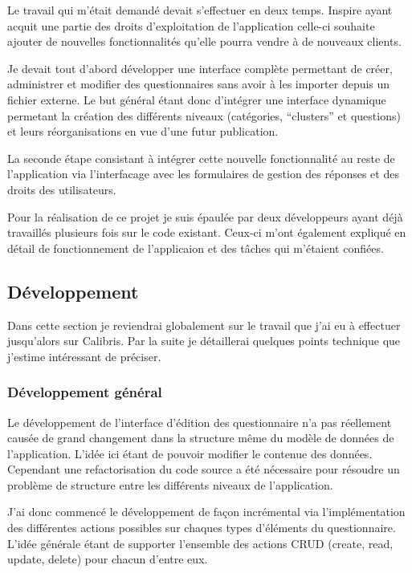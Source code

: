 \documentclass[12pt,a4paper]{book}
\begin{document}
Le travail qui m'était demandé devait s'effectuer en deux temps. Inspire ayant acquit une partie des droits d'exploitation de l'application celle-ci souhaite ajouter de nouvelles fonctionnalités qu'elle pourra vendre à de nouveaux clients.

Je devait tout d'abord développer une interface complète permettant de créer, administrer et modifier des questionnaires sans avoir à les importer depuis un fichier externe. Le but général étant donc d'intégrer une interface dynamique permetant la création des différents niveaux (catégories, ``clusters'' et questions) et leurs réorganisations en vue d'une futur publication.

La seconde étape consistant à intégrer cette nouvelle fonctionnalité au reste de l'application via l'interfacage avec les formulaires de gestion des réponses et des droits des utilisateurs.

Pour la réalisation de ce projet je suis épaulée par deux développeurs ayant déjà travaillés plusieurs fois sur le code existant. Ceux-ci m'ont également expliqué en détail de fonctionnement de l'applicaion et des tâches qui m'étaient confiées.

\subsection{Développement}

Dans cette section je reviendrai globalement sur le travail que j'ai eu à effectuer jusqu'alors sur Calibris. Par la suite je détaillerai quelques points technique que j'estime intéressant de préciser.

\subsubsection{Développement général}

Le développement de l'interface d'édition des questionnaire n'a pas réellement causée de grand changement dans la structure même du modèle de données de l'application. L'idée ici étant de pouvoir modifier le contenue des données. Cependant une refactorisation du code source a été nécessaire pour résoudre un problème de structure entre les différents niveaux de l'application.

J'ai donc commencé le développement de façon incrémental via l'implémentation des différentes actions possibles sur chaques types d'éléments du questionnaire. L'idée générale étant de supporter l'ensemble des actions CRUD (create, read, update, delete) pour chacun d'entre eux.
\end{document}
